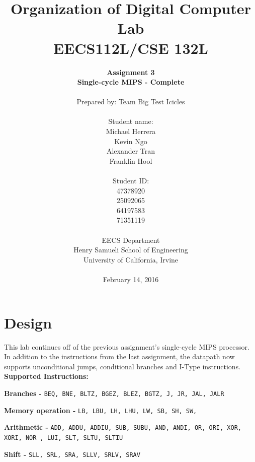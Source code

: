 \documentclass{article}
\begin{document}
\title{Organization of Digital Computer Lab \\ EECS112L/CSE 132L}
\author{\textbf{Assignment 3 }\\ \textbf{Single-cycle MIPS - Complete} \\ \\
Prepared by: Team Big Test Icicles \\ \\ Student name: \\ Michael Herrera \\ Kevin Ngo \\ Alexander Tran \\ Franklin Hool \\ \\ Student ID: \\ 47378920 \\ 25092065 \\ 64197583 \\ 71351119 \\ \\ 
EECS Department\\ Henry Samueli School of Engineering \\ University of California, Irvine \\ \\
{February 14, 2016}} 


\date{}
\maketitle


\section{Design}
 This lab continues off of the previous assignment's single-cycle MIPS processor. In addition to the instructions from the last assignment, the datapath now supports unconditional jumps, conditional branches and I-Type instructions.  
\\

\textbf{Supported Instructions:}

\textbf{Branches - }\texttt{BEQ, BNE, BLTZ, BGEZ, BLEZ, BGTZ, J, JR, JAL, JALR}

\textbf{Memory operation - }\texttt{LB, LBU, LH, LHU, LW, SB, SH, SW, }

\textbf{Arithmetic - }\texttt{ADD, ADDU, ADDIU, SUB, SUBU, AND, ANDI, OR, ORI, XOR, XORI, NOR , LUI, SLT, SLTU, SLTIU}

\textbf{Shift - }\texttt{SLL, SRL, SRA, SLLV, SRLV, SRAV}
\end{document}
